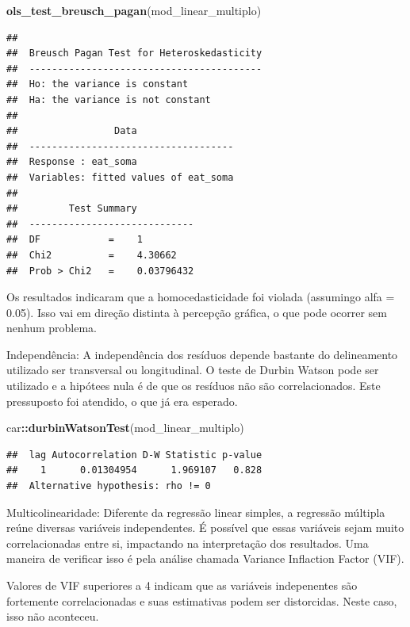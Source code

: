 \documentclass[
]{book}
\newenvironment{Shaded}{\begin{snugshade}}{\end{snugshade}}
\newcommand{\KeywordTok}[1]{\textcolor[rgb]{0.13,0.29,0.53}{\textbf{#1}}}
\newcommand{\NormalTok}[1]{#1}
\newcommand{\OperatorTok}[1]{\textcolor[rgb]{0.81,0.36,0.00}{\textbf{#1}}}
\begin{document}
\begin{Shaded}
\begin{Highlighting}[]
\KeywordTok{ols_test_breusch_pagan}\NormalTok{(mod_linear_multiplo)}
\end{Highlighting}
\end{Shaded}

\begin{verbatim}
## 
##  Breusch Pagan Test for Heteroskedasticity
##  -----------------------------------------
##  Ho: the variance is constant            
##  Ha: the variance is not constant        
## 
##                 Data                 
##  ------------------------------------
##  Response : eat_soma 
##  Variables: fitted values of eat_soma 
## 
##         Test Summary          
##  -----------------------------
##  DF            =    1 
##  Chi2          =    4.30662 
##  Prob > Chi2   =    0.03796432
\end{verbatim}

Os resultados indicaram que a homocedasticidade foi violada (assumingo alfa = 0.05). Isso vai em direção distinta à percepção gráfica, o que pode ocorrer sem nenhum problema.

Independência: A independência dos resíduos depende bastante do delineamento utilizado ser transversal ou longitudinal. O teste de Durbin Watson pode ser utilizado e a hipótees nula é de que os resíduos não são correlacionados. Este pressuposto foi atendido, o que já era esperado.

\begin{Shaded}
\begin{Highlighting}[]
\NormalTok{car}\OperatorTok{::}\KeywordTok{durbinWatsonTest}\NormalTok{(mod_linear_multiplo)}
\end{Highlighting}
\end{Shaded}

\begin{verbatim}
##  lag Autocorrelation D-W Statistic p-value
##    1      0.01304954      1.969107   0.828
##  Alternative hypothesis: rho != 0
\end{verbatim}

Multicolinearidade: Diferente da regressão linear simples, a regressão múltipla reúne diversas variáveis independentes. É possível que essas variáveis sejam muito correlacionadas entre si, impactando na interpretação dos resultados. Uma maneira de verificar isso é pela análise chamada Variance Inflaction Factor (VIF).

Valores de VIF superiores a 4 indicam que as variáveis indepenentes são fortemente correlacionadas e suas estimativas podem ser distorcidas. Neste caso, isso não aconteceu.
\end{document}
